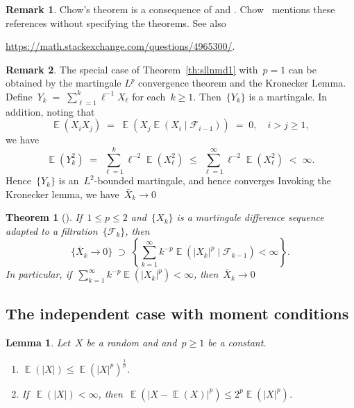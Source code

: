 \documentclass[12pt,a4paper]{article}  %
\newcounter{cite}
\newtheorem{theorem}{Theorem}[section]
\newtheorem{lemma}{Lemma}[section]
\theoremstyle{definition}
\newtheorem{remark}{Remark}[section]
\numberwithin{equation}{section}
\newcommand{\FF}{\mathcal{F}}
\newcommand{\as}{{\text{a.s.}}\xspace}
\DeclareMathOperator{\expc}{\mathbb{E}}
\begin{document}
\begin{remark}
    \label{rem:chow}
    Chow's theorem is a consequence of \cite[Theorem~2]{Chow_1960} and
    \cite[Theorem~9]{Burkholder_1966}. Chow~\cite{Chow_1967} mentions these references without
    specifying the theorems. See also
    \begin{center}
    \url{https://math.stackexchange.com/questions/4965300/}.
    \end{center}
\end{remark}

\begin{remark}
    \label{rem:kronecker}
    The special case of Theorem~\ref{th:sllnmd1} with~$p=1$ can be obtained by
    the martingale $L^p$ convergence theorem and the Kronecker Lemma.
    Define~$Y_k \;=\;  \sum_{\ell=1}^k \ell^{-1}X_\ell$ for each~$k\ge 1$. Then~$\{Y_k\}$ is
    a martingale. In addition, noting that
    \[
        \expc(X_iX_j) \;=\;  \expc(X_j\expc(X_i\mathrel{|}\FF_{i-1})) \;=\; 0, \quad i >j \ge 1,
    \]
    we have
    \[
        \expc(Y_k^2) \;=\; \sum_{\ell=1}^k \ell^{-2}\expc(X_\ell^2) \;\le\; \sum_{\ell=1}^\infty \ell^{-2}
        \expc(X_\ell^2) \;<\; \infty.
    \]
    Hence~$\{Y_k\}$ is an~$L^2$-bounded martingale, and hence converges \as
    Invoking the Kronecker lemma, we have~$\bar{X}_k \to 0$ \as
\end{remark}

\begin{theorem}[\mbox{\cite[Theorem~2.18]{Hall_Heyde_1980}}]
    \label{th:sllnmd2}
    If~$1\le p\le 2$ and~$\{X_k\}$ is a martingale difference sequence adapted to a filtration~$\{\FF_k\}$, then
   \[
       \{\bar{X}_k \to 0\} \;\supset\; \left\{ \sum_{k=1}^\infty k^{-p} \expc(|X_k|^p
       \mathrel{|} \FF_{k-1}) < \infty \right\}.
   \]
   In particular, if~$\sum_{k=1}^\infty k^{-p} \expc(|X_k|^p) < \infty$, then~$\bar{X}_k \to 0$ \as
\end{theorem}

\subsection{The independent case with moment conditions}
\label{sec:sllnindep}

\begin{lemma}
    \label{lem:expc}
    Let~$X$ be a random and and~$p \ge 1$ be a constant.
    \begin{enumerate}
        \item $\expc(|X|) \le \expc(|X|^p)^{\frac{1}{p}}$.
        \item If~$\expc(|X|) < \infty$, then~$\expc(|X - \expc(X)|^p)\le 2^p \expc(|X|^p)$.
    \end{enumerate}
\end{lemma}
\end{document}
